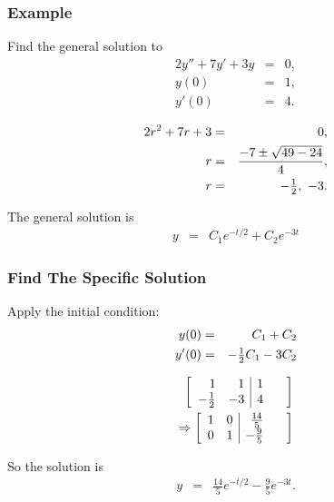 \begin{frame}
  \frametitle{Example}

  Find the general solution to
  \begin{eqnarray*}
    2y'' + 7y' + 3y & = & 0, \\
    y(0) & = & 1, \\
    y'(0) & = & 4.
  \end{eqnarray*}

  {
    \begin{eqnarray*}
      2r^2 + 7r + 3 & = & 0, \\
      r & = & \frac{-7\pm\sqrt{49-24}}{4}, \\
      r & = & -\mbox{$\frac{1}{2}$},~-3.
    \end{eqnarray*}

    The general solution is
    \begin{eqnarray*}
      y & = & C_1 e^{-t/2} + C_2 e^{-3t}
    \end{eqnarray*}

  }


\end{frame}


\begin{frame}
  \frametitle{Find The Specific Solution}

  Apply the initial condition:
  \begin{eqnarray*}
    y(0) & = & C_1 + C_2 \\
    y'(0) & = & -\mbox{$\frac{1}{2}$} C_1 - 3 C_2
  \end{eqnarray*}

  \begin{eqnarray*}
    \left[ \begin{array}{rr|rr}
    1 & 1 & 1 & ~ \\ 
    -\mbox{$\frac{1}{2}$} & -3 & 4 & ~ \\ 
    \end{array} \right] \\
    \Rightarrow
    \left[ \begin{array}{rr|rr}
    1 & 0 & \frac{14}{5} & ~ \\ 
    0 & 1 & -\frac{9}{5} & ~ \\ 
    \end{array} \right]
  \end{eqnarray*}

  So the solution is
  \begin{eqnarray*}
    y & = & \frac{14}{5} e^{-t/2} - \frac{9}{5} e^{-3t}.
  \end{eqnarray*}


\end{frame}



